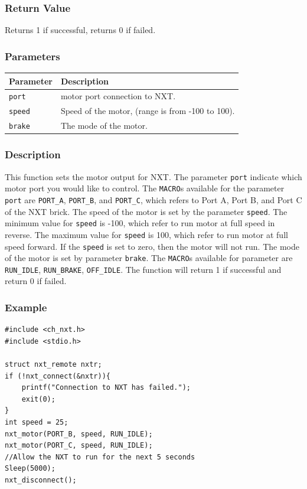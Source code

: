 \documentclass[12pt]{article}
\begin{document}
\subsubsection*{Return Value}
Returns 1 if successful, returns 0 if failed.

\subsubsection*{Parameters}
\begin{tabular}{ l | p{12cm} }
Parameter		& Description\\ \hline
\verb+port+		& motor port connection to NXT.\\
\verb+speed+	& Speed of the motor, (range is from -100 to 100).\\
\verb+brake+	& The mode of the motor.
\end{tabular}

\subsubsection*{Description}
This function sets the motor output for NXT. The parameter \verb+port+ indicate which motor port you would like to control. The \verb+MACRO+s available for the parameter \verb+port+ are \verb+PORT_A+, 	\verb+PORT_B+, and \verb+PORT_C+, which refers to Port A, Port B, and Port C of the NXT brick. The speed of the motor is set by the parameter \verb+speed+. The minimum value for \verb+speed+ is -100, which refer to run motor at full speed in reverse. The maximum value for \verb+speed+ is 100, which refer to run motor at full speed forward. If the \verb+speed+ is set to zero, then the motor will not run. The mode of the motor is set by parameter \verb+brake+. The \verb+MACRO+s available for parameter are \verb+RUN_IDLE+, \verb+RUN_BRAKE+, \verb+OFF_IDLE+. The function will return 1 if successful and return 0 if failed.

\subsubsection*{Example}
\begin{verbatim}
#include <ch_nxt.h> 
#include <stdio.h>

struct nxt_remote nxtr;
if (!nxt_connect(&nxtr)){
    printf("Connection to NXT has failed.");
    exit(0);
}
int speed = 25;
nxt_motor(PORT_B, speed, RUN_IDLE);
nxt_motor(PORT_C, speed, RUN_IDLE);
//Allow the NXT to run for the next 5 seconds
Sleep(5000);
nxt_disconnect();    
\end{verbatim}
\end{document}

